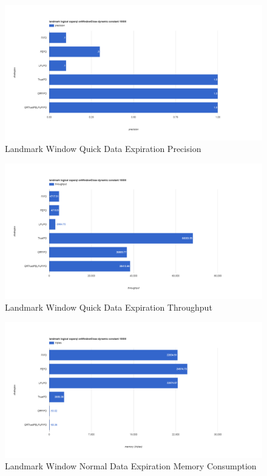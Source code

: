 \begin{figure}[!htbp]
	\centering
    \includegraphics[width=6.5in]{img/app3-land-quick-p.png}
    \caption{Landmark Window Quick Data Expiration Precision}
\end{figure}
\begin{figure}[!htbp]
	\centering
    \includegraphics[width=6.5in]{img/app3-land-quick-t.png}
    \caption{Landmark Window Quick Data Expiration Throughput}
\end{figure}
\begin{figure}[!htbp]
	\centering
    \includegraphics[width=6.5in]{img/app3-land-normal-m.png}
    \caption{Landmark Window Normal Data Expiration Memory Consumption}
\end{figure}
